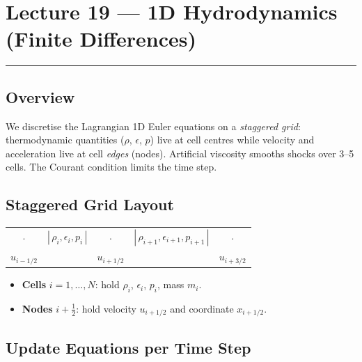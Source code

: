 
\section{Lecture 19 — 1D Hydrodynamics (Finite Differences)}\label{sec:lec19}
\hrule\vspace{1.5em}

\subsection*{Overview}
We discretise the Lagrangian 1D Euler equations on a
\emph{staggered grid}: thermodynamic quantities ($\rho$, $\epsilon$, $p$)
live at cell centres while velocity and acceleration live at cell
\emph{edges} (nodes).  Artificial viscosity smooths shocks over
3–5 cells.  The Courant condition limits the time step.

\subsection{Staggered Grid Layout}\label{subsec:lec19:stagger}

\begin{center}
\begin{tabular}{ccccc}
  $\cdot$ & $|\,\rho_i,\epsilon_i,p_i\,|$ & $\cdot$
          & $|\,\rho_{i+1},\epsilon_{i+1},p_{i+1}\,|$ & $\cdot$ \\
  $u_{i-1/2}$ & & $u_{i+1/2}$ & & $u_{i+3/2}$
\end{tabular}
\end{center}

\begin{itemize}
  \item \textbf{Cells} $i = 1,\ldots,N$: hold $\rho_i$, $\epsilon_i$, $p_i$, mass $m_i$.
  \item \textbf{Nodes} $i+\tfrac{1}{2}$: hold velocity $u_{i+1/2}$ and
        coordinate $x_{i+1/2}$.
\end{itemize}

\subsection{Update Equations per Time Step}\label{subsec:lec19:update}

